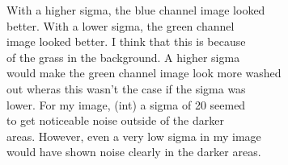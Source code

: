 With a higher sigma, the blue channel image looked\\
better.  With a lower sigma, the green channel\\
image looked better.  I think that this is because\\
of the grass in the background.  A higher sigma\\
would make the green channel image look more washed\\
out wheras this wasn't the case if the sigma was\\
lower.  For my image, (int) a sigma of 20 seemed\\
to get noticeable noise outside of the darker\\
areas.  However, even a very low sigma in my image\\
would have shown noise clearly in the darker areas.
